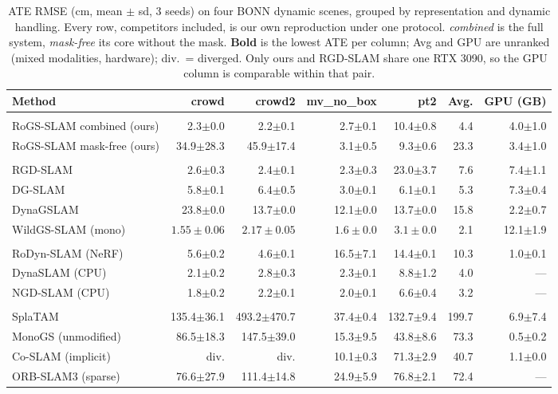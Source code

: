 \begin{table}[t]\centering\scriptsize\setlength{\tabcolsep}{2pt}
\begin{tabular}{>{\raggedright\arraybackslash}p{3.3cm}rrrrrr}\toprule
Method & crowd & crowd2 & mv\_no\_box & pt2 & Avg. & GPU (GB) \\ \midrule
\multicolumn{7}{l}{\emph{Ours, dynamic 3DGS}} \\
RoGS-SLAM combined (ours) & 2.3$\pm$0.0 & 2.2$\pm$0.1 & 2.7$\pm$0.1 & 10.4$\pm$0.8 & 4.4 & 4.0$\pm$1.0 \\
RoGS-SLAM mask-free (ours) & 34.9$\pm$28.3 & 45.9$\pm$17.4 & 3.1$\pm$0.5 & 9.3$\pm$0.6 & 23.3 & 3.4$\pm$1.0 \\
\midrule
\multicolumn{7}{l}{\emph{Dynamic 3DGS}} \\
RGD-SLAM & 2.6$\pm$0.3 & 2.4$\pm$0.1 & 2.3$\pm$0.3 & 23.0$\pm$3.7 & 7.6 & 7.4$\pm$1.1 \\
DG-SLAM & 5.8$\pm$0.1 & 6.4$\pm$0.5 & 3.0$\pm$0.1 & 6.1$\pm$0.1 & 5.3 & 7.3$\pm$0.4 \\
DynaGSLAM & 23.8$\pm$0.0 & 13.7$\pm$0.0 & 12.1$\pm$0.0 & 13.7$\pm$0.0 & 15.8 & 2.2$\pm$0.7 \\
WildGS-SLAM (mono) & {\boldmath$1.55\pm0.06$} & {\boldmath$2.17\pm0.05$} & {\boldmath$1.6\pm0.0$} & {\boldmath$3.1\pm0.0$} & 2.1 & 12.1$\pm$1.9 \\
\midrule
\multicolumn{7}{l}{\emph{Dynamic, non-3DGS}} \\
RoDyn-SLAM (NeRF) & 5.6$\pm$0.2 & 4.6$\pm$0.1 & 16.5$\pm$7.1 & 14.4$\pm$0.1 & 10.3 & 1.0$\pm$0.1 \\
DynaSLAM (CPU) & 2.1$\pm$0.2 & 2.8$\pm$0.3 & 2.3$\pm$0.1 & 8.8$\pm$1.2 & 4.0 & --- \\
NGD-SLAM (CPU) & 1.8$\pm$0.2 & 2.2$\pm$0.1 & 2.0$\pm$0.1 & 6.6$\pm$0.4 & 3.2 & --- \\
\midrule
\multicolumn{7}{l}{\emph{Static}} \\
SplaTAM & 135.4$\pm$36.1 & 493.2$\pm$470.7 & 37.4$\pm$0.4 & 132.7$\pm$9.4 & 199.7 & 6.9$\pm$7.4 \\
MonoGS (unmodified) & 86.5$\pm$18.3 & 147.5$\pm$39.0 & 15.3$\pm$9.5 & 43.8$\pm$8.6 & 73.3 & 0.5$\pm$0.2 \\
Co-SLAM (implicit) & div. & div. & 10.1$\pm$0.3 & 71.3$\pm$2.9 & 40.7 & 1.1$\pm$0.0 \\
ORB-SLAM3 (sparse) & 76.6$\pm$27.9 & 111.4$\pm$14.8 & 24.9$\pm$5.9 & 76.8$\pm$2.1 & 72.4 & --- \\
\bottomrule\end{tabular}
\caption{ATE RMSE (cm, mean $\pm$ sd, 3 seeds) on four BONN dynamic scenes, grouped by representation and dynamic handling. Every row, competitors included, is our own reproduction under one protocol. \emph{combined} is the full system, \emph{mask-free} its core without the mask. \textbf{Bold} is the lowest ATE per column; Avg and GPU are unranked (mixed modalities, hardware); div.\ = diverged. Only ours and RGD-SLAM share one RTX 3090, so the GPU column is comparable within that pair.}\end{table}



